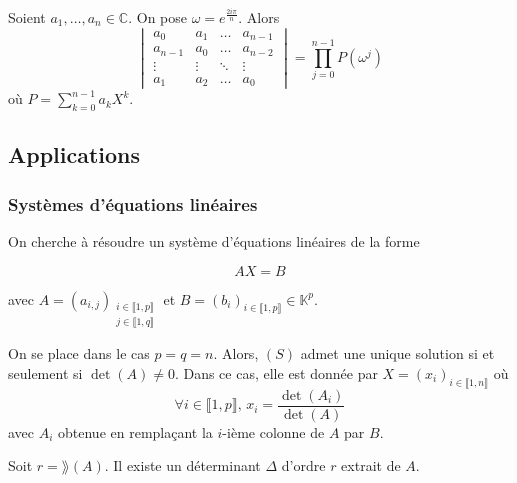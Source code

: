 	\begin{example}
		Soient $a_1, \dots, a_n \in \mathbb{C}$. On pose $\omega = e^{\frac{2i\pi}{n}}$. Alors
		\[ \begin{vmatrix} a_0 & a_1 & \dots & a_{n-1} \\ a_{n-1} & a_0 & \dots & a_{n-2}\\ \vdots & \vdots & \ddots & \vdots \\ a_1 & a_2 & \dots & a_0 \end{vmatrix} = \prod_{j=0}^{n-1} P(\omega^j) \]
		où $P = \sum_{k=0}^{n-1} a_k X^k$.
	\end{example}

	\subsection{Applications}

	\subsubsection{Systèmes d'équations linéaires}


	On cherche à résoudre un système d'équations linéaires de la forme

	\[ AX = B \tag{S} \]

	avec $A = (a_{i,j})_{\substack{i \in \llbracket 1, p \rrbracket \\ j \in \llbracket 1, q \rrbracket}}$ et $B = (b_i)_{i \in \llbracket 1, p \rrbracket} \in \mathbb{K}^p$.

	\begin{theorem}
		On se place dans le cas $p = q = n$. Alors, $(S)$ admet une unique solution si et seulement si $\det(A) \neq 0$. Dans ce cas, elle est donnée par $X = (x_i)_{i \in \llbracket 1, n \rrbracket}$ où
		\[ \forall i \in \llbracket 1, p \rrbracket, \, x_i = \frac{\det(A_i)}{\det(A)} \]
		avec $A_i$ obtenue en remplaçant la $i$-ième colonne de $A$ par $B$.
	\end{theorem}

	\begin{lemma}
		Soit $r = \rang(A)$. Il existe un déterminant $\Delta$ d'ordre $r$ extrait de $A$.
	\end{lemma}

